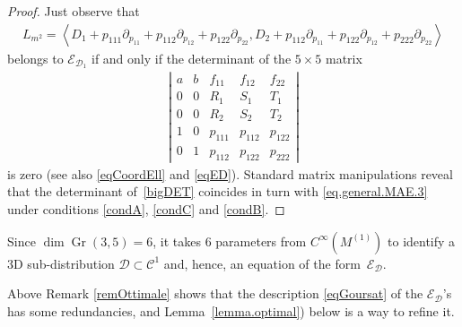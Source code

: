 \documentclass[10pt,a4paper]{amsart}
\newcommand{\C}{\mathcal{C}}
\newcommand{\D}{\mathcal{D}}
\newcommand{\E}{\mathcal{E}}
\newcommand{\Gr}{\operatorname{Gr}}
\newcommand{\Span}[1]{\left\langle #1 \right\rangle}
\numberwithin{equation}{section}
\begin{document}
\begin{proof}
 Just observe that
\begin{gather*}
L_{m^2}=\Span{ D_1+ p_{111}\partial_{p_{11}}+p_{112}\partial_{p_{12}}+p_{122}\partial_{p_{22}}, D_2 + p_{112}\partial_{p_{11}}+p_{122}\partial_{p_{12}}+p_{222}\partial_{p_{22}} }
\end{gather*}
belongs to $\E_{\D_1}$ if and only if the determinant of the $5\times 5$ matrix
\begin{gather}\label{bigDET}
\left|\begin{matrix}a & b & f_{11} & f_{12} & f_{22} \\0 & 0 & R_1 & S_1 & T_1 \\0 & 0 & R_2 & S_2 & T_2 \\1 & 0 & p_{111} & p_{112} & p_{122} \\0 & 1 & p_{112} & p_{122} & p_{222}\end{matrix}\right|
\end{gather}
is zero (see also \eqref{eqCoordEll} and \eqref{eqED}). Standard matrix manipulations reveal that the determinant of~\eqref{bigDET} coincides in turn with \eqref{eq.general.MAE.3} under conditions \eqref{condA}, \eqref{condC} and \eqref{condB}.
\end{proof}

\begin{Remark}\label{remOttimale}
Since $\dim\Gr(3,5)=6$, it takes 6 parameters from $C^\infty(M^{(1)})$ to identify a 3D sub-distribution $\D\subset\C^1$ and, hence, an equation of the form~$\E_\D$.
\end{Remark}

Above Remark \ref{remOttimale} shows that the description \eqref{eqGoursat} of the $\E_\D$'s has some redundancies, and Lemma~\ref{lemma.optimal}) below
is a way to ref\/ine it.
\end{document}
